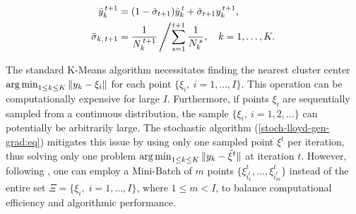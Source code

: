 \begin{equation}
    \label{kmeans-trajectory-avg-alt:eq}
    \begin{aligned}
        \tilde{y}_k^{\,t+1} &= (1 - \tilde{\sigma}_{t+1}) \tilde{y}_k^{\,t} + \tilde{\sigma}_{t+1} y_k^{\,t+1}, \\
        \tilde{\sigma}_{k, \,t+1} &= \frac{1}{N_k^{\,t+1}} \left/ \sum_{s=1}^{t+1} \frac{1}{N_k^{\,s}}, \quad k = 1, \ldots, K. \right.
    \end{aligned}
\end{equation}

The standard K-Means algorithm necessitates finding the nearest cluster center $\operatorname*{arg\,min}_{1 \leq k \leq K} \| y_k - \xi_i \|$ for each point $\{ \xi_i, \> i = 1, \ldots, I \}$. This operation can be computationally expensive for large $I$. Furthermore, if points $\xi_i$ are sequentially sampled from a continuous distribution, the sample $\{ \xi_i, \> i = 1, 2, \ldots \}$ can potentially be arbitrarily large. The stochastic algorithm (\ref{stoch-lloyd-gen-grad:eq}) mitigates this issue by using only one sampled point ${\xi}^t$ per iteration, thus solving only one problem $\operatorname*{arg\,min}_{1 \leq k \leq K} \| y_k - \tilde{\xi}^t \|$ at iteration $t$. However, following \cite{Sculley_2010}, one can employ a Mini-Batch of $m$ points $\{ {\xi}^t_{i_1^t}, \ldots, {\xi}^t_{i_m^t} \}$ instead of the entire set $\Xi= \{ \xi_i,\;i=1,\ldots,I \}$, where $1 \leq m < I$, to balance computational efficiency and algorithmic performance.
